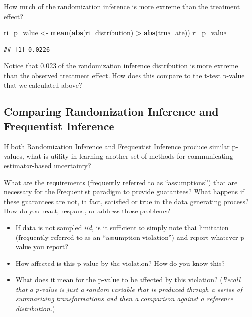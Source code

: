 \documentclass[
]{article}
\newenvironment{Shaded}{\begin{snugshade}}{\end{snugshade}}
\newcommand{\FunctionTok}[1]{\textcolor[rgb]{0.13,0.29,0.53}{\textbf{#1}}}
\newcommand{\NormalTok}[1]{#1}
\newcommand{\OtherTok}[1]{\textcolor[rgb]{0.56,0.35,0.01}{#1}}
\newcommand{\SpecialCharTok}[1]{\textcolor[rgb]{0.81,0.36,0.00}{\textbf{#1}}}
\providecommand{\tightlist}{%
  \setlength{\itemsep}{0pt}\setlength{\parskip}{0pt}}
\theoremstyle{definition}
\theoremstyle{definition}
\theoremstyle{definition}
\theoremstyle{definition}
\theoremstyle{remark}
\begin{document}
How much of the randomization inference is more extreme than the treatment effect?

\begin{Shaded}
\begin{Highlighting}[]
\NormalTok{ri\_p\_value }\OtherTok{\textless{}{-}} \FunctionTok{mean}\NormalTok{(}\FunctionTok{abs}\NormalTok{(ri\_distribution) }\SpecialCharTok{\textgreater{}} \FunctionTok{abs}\NormalTok{(true\_ate))}
\NormalTok{ri\_p\_value}
\end{Highlighting}
\end{Shaded}

\begin{verbatim}
## [1] 0.0226
\end{verbatim}

Notice that 0.023 of the randomization inference distribution is more extreme than the observed treatment effect. How does this compare to the t-test p-value that we calculated above?

\subsection{Comparing Randomization Inference and Frequentist Inference}\label{comparing-randomization-inference-and-frequentist-inference}

If both Randomization Inference and Frequentist Inference produce similar p-values, what is utility in learning another set of methods for communicating estimator-based uncertainty?

What are the requirements (frequently referred to as ``assumptions'') that are necessary for the Frequentist paradigm to provide guarantees? What happens if these guarantees are not, in fact, satisfied or true in the data generating process? How do you react, respond, or address those problems?

\begin{itemize}
\tightlist
\item
  If data is not sampled \emph{iid}, is it sufficient to simply note that limitation (frequently referred to as an ``assumption violation'') and report whatever p-value you report?
\item
  How affected is this p-value by the violation? How do you know this?
\item
  What does it mean for the p-value to be affected by this violation? (\emph{Recall that a p-value is just a random variable that is produced through a series of summarizing transformations and then a comparison against a reference distribution.})
\end{itemize}
\end{document}
